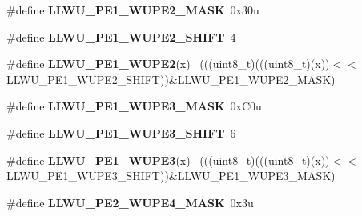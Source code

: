 \begin{DoxyCompactItemize}
\item 
\hypertarget{group___l_l_w_u___register___masks_ga97e8e2fc8ce673f6b4625d307bc94b4a}{}\#define {\bfseries L\+L\+W\+U\+\_\+\+P\+E1\+\_\+\+W\+U\+P\+E2\+\_\+\+M\+A\+S\+K}~0x30u\label{group___l_l_w_u___register___masks_ga97e8e2fc8ce673f6b4625d307bc94b4a}

\item 
\hypertarget{group___l_l_w_u___register___masks_ga0b1bb86eb31a82a18ad1491b0305000b}{}\#define {\bfseries L\+L\+W\+U\+\_\+\+P\+E1\+\_\+\+W\+U\+P\+E2\+\_\+\+S\+H\+I\+F\+T}~4\label{group___l_l_w_u___register___masks_ga0b1bb86eb31a82a18ad1491b0305000b}

\item 
\hypertarget{group___l_l_w_u___register___masks_gaf0bb98cad9b61c52ec222ab4443f6999}{}\#define {\bfseries L\+L\+W\+U\+\_\+\+P\+E1\+\_\+\+W\+U\+P\+E2}(x)                                            ~(((uint8\+\_\+t)(((uint8\+\_\+t)(x))$<$$<$L\+L\+W\+U\+\_\+\+P\+E1\+\_\+\+W\+U\+P\+E2\+\_\+\+S\+H\+I\+F\+T))\&L\+L\+W\+U\+\_\+\+P\+E1\+\_\+\+W\+U\+P\+E2\+\_\+\+M\+A\+S\+K)\label{group___l_l_w_u___register___masks_gaf0bb98cad9b61c52ec222ab4443f6999}

\item 
\hypertarget{group___l_l_w_u___register___masks_ga44cae929b3178e210eb5e1346a4ce997}{}\#define {\bfseries L\+L\+W\+U\+\_\+\+P\+E1\+\_\+\+W\+U\+P\+E3\+\_\+\+M\+A\+S\+K}~0x\+C0u\label{group___l_l_w_u___register___masks_ga44cae929b3178e210eb5e1346a4ce997}

\item 
\hypertarget{group___l_l_w_u___register___masks_gaceee1b1b6323ba4d33abf875718e885a}{}\#define {\bfseries L\+L\+W\+U\+\_\+\+P\+E1\+\_\+\+W\+U\+P\+E3\+\_\+\+S\+H\+I\+F\+T}~6\label{group___l_l_w_u___register___masks_gaceee1b1b6323ba4d33abf875718e885a}

\item 
\hypertarget{group___l_l_w_u___register___masks_gaa17ad889c6732bb2f6352d4e5877058c}{}\#define {\bfseries L\+L\+W\+U\+\_\+\+P\+E1\+\_\+\+W\+U\+P\+E3}(x)                                            ~(((uint8\+\_\+t)(((uint8\+\_\+t)(x))$<$$<$L\+L\+W\+U\+\_\+\+P\+E1\+\_\+\+W\+U\+P\+E3\+\_\+\+S\+H\+I\+F\+T))\&L\+L\+W\+U\+\_\+\+P\+E1\+\_\+\+W\+U\+P\+E3\+\_\+\+M\+A\+S\+K)\label{group___l_l_w_u___register___masks_gaa17ad889c6732bb2f6352d4e5877058c}

\item 
\hypertarget{group___l_l_w_u___register___masks_ga94128d26c60f13d22acf47200f4f37e0}{}\#define {\bfseries L\+L\+W\+U\+\_\+\+P\+E2\+\_\+\+W\+U\+P\+E4\+\_\+\+M\+A\+S\+K}~0x3u\label{group___l_l_w_u___register___masks_ga94128d26c60f13d22acf47200f4f37e0}


\end{DoxyCompactItemize}
